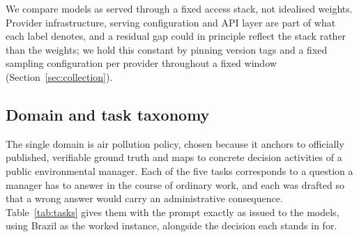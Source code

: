 We compare models as served through a fixed access stack, not idealised
weights. Provider infrastructure, serving configuration and API layer are part
of what each label denotes, and a residual gap could in principle reflect the
stack rather than the weights; we hold this constant by pinning version tags and
a fixed sampling configuration per provider throughout a fixed window
(Section~\ref{sec:collection}).

\subsection{Domain and task taxonomy}
\label{sec:tasks}

The single domain is air pollution policy, chosen because it anchors to
officially published, verifiable ground truth and maps to concrete decision
activities of a public environmental manager. Each of the five tasks corresponds
to a question a manager has to answer in the course of ordinary work, and each
was drafted so that a wrong answer would carry an administrative consequence.
Table~\ref{tab:tasks} gives them with the prompt exactly as issued to the models,
using Brazil as the worked instance, alongside the decision each stands in for.

